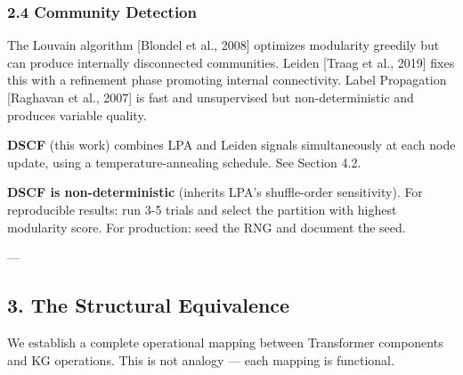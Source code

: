 \documentclass[10pt,journal,compsoc]{IEEEtran}
\begin{document}
\subsubsection{2.4 Community Detection}

The Louvain algorithm [Blondel et al., 2008] optimizes modularity greedily
but can produce internally disco\-nnected communities. Leiden [Traag et al.,
2019] fixes this with a refinement phase promoting internal conne\-ctivity.
Label Propagation [Raghavan et al., 2007] is fast and unsup\-ervised but
non-deter\-ministic and produces variable quality.

\textbf{DSCF} (this work) combines LPA and Leiden signals simul\-taneously at each
node update, using a temperature-annealing schedule. See Section 4.2.

\textbf{DSCF is non-deter\-ministic} (inherits LPA's shuffle-order sensitivity).
For repro\-ducible results: run 3-5 trials and select the partition with
highest modularity score. For production: seed the RNG and document the seed.

---

\subsection{3. The Structural Equivalence}

We establish a complete operational mapping between Transformer components
and KG operations. This is not analogy — each mapping is functional.
\end{document}
